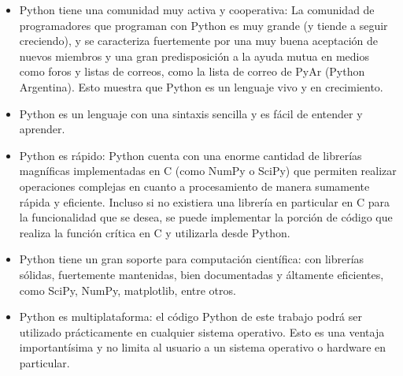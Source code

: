 			\begin{itemize}
	
			\item Python tiene una comunidad muy activa y cooperativa: La comunidad de programadores que programan con Python es muy grande (y tiende a seguir creciendo), y se caracteriza fuertemente por una muy buena aceptación de nuevos miembros y una gran predisposición a la ayuda mutua en medios como foros y listas de correos, como la lista de correo de PyAr (Python Argentina). Esto muestra que Python es un lenguaje vivo y en crecimiento.
			
			\item Python es un lenguaje con una sintaxis sencilla y es fácil de entender y aprender.
			
			\item Python es rápido: Python cuenta con una enorme cantidad de librerías magníficas implementadas en C (como NumPy o SciPy) que permiten realizar operaciones complejas en cuanto a procesamiento de manera sumamente rápida y eficiente. Incluso si no existiera una librería en particular en C para la funcionalidad que se desea, se puede implementar la porción de código que realiza la función crítica en C y utilizarla desde Python.
			
			\item Python tiene un gran soporte para computación científica: con librerías sólidas, fuertemente mantenidas, bien documentadas y áltamente eficientes, como SciPy, NumPy, matplotlib, entre otros.
			
			\item Python es multiplataforma: el código Python de este trabajo podrá ser utilizado prácticamente en cualquier sistema operativo. Esto es una ventaja importantísima y no limita al usuario a un sistema operativo o hardware en particular.
			\end{itemize}
	